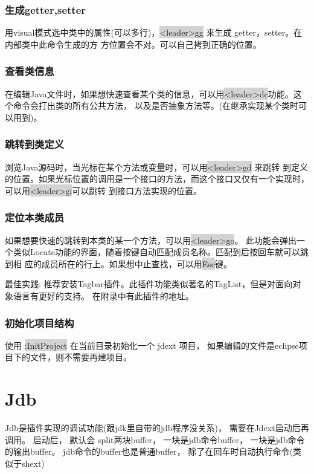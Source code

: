 \documentclass[oneside,openany]{book}
\begin{document}
\subsubsection{生成getter,setter}
    用visual模式选中类中的属性(可以多行)，\colorbox{lightgray}{<leader>gg} 来生成 getter，setter。在内部类中此命令生成的方
方位置会不对。可以自己拷到正确的位置。

\subsubsection{查看类信息}
   在编辑Java文件时，如果想快速查看某个类的信息，可以用\colorbox{lightgray}{<leader>dc}功能。这个命令会打出类的所有公共方法，
以及是否抽象方法等。(在继承实现某个类时可以用到)。

\subsubsection{跳转到类定义}
浏览Java源码时，当光标在某个方法或变量时，可以用\colorbox{lightgray}{<leader>gd} 来跳转
到定义的位置。如果光标位置的调用是一个接口的方法，而这个接口又仅有一个实现时，可以用\colorbox{lightgray}{<leader>gi}可以跳转
到接口方法实现的位置。

\subsubsection{定位本类成员}
  如果想要快速的跳转到本类的某一个方法，可以用\colorbox{lightgray}{<leader>go}。
  此功能会弹出一个类似Locate功能的界面，随着按键自动匹配成员名称。匹配到后按回车就可以跳到相
  应的成员所在的行上。如果想中止查找，可以用\colorbox{lightgray}{Esc}键。
  \begin{mdframed}[style=BestPracticeFrame]
    最佳实践: 推荐安装Tagbar插件。此插件功能类似著名的TagList，但是对面向对象语言有更好的支持。
    在附录中有此插件的地址。
  \end{mdframed}

\subsubsection{初始化项目结构}
使用 \colorbox{lightgray}{:InitProject} 在当前目录初始化一个 jdext 项目， 如果编辑的文件是eclipse项目下的文件，则不需要再建项目。 

\section{Jdb}
    Jdb是插件实现的调试功能(跟jdk里自带的jdb程序没关系)， 需要在Jdext启动后再调用。 启动后， 默认会 
    split两块buffer， 一块是jdb命令buffer， 一块是jdb命令的输出buffer。 jdb命令的buffer也是普通buffer， 除了在回车时自动执行命令(类似于shext) 
\end{document}
